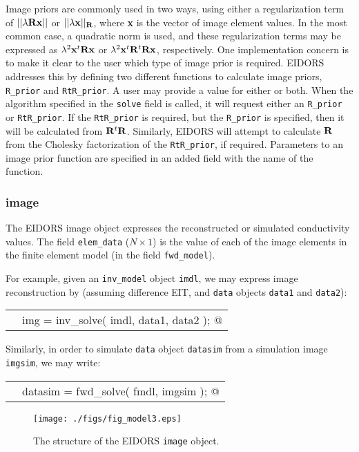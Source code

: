 \documentclass[12pt]{iopart}
\makeatletter
\newcommand{\CODEstart}{\medskip\begin{tabular}{ll}}
\newcommand{\CN}{\tt\scriptsize} %
\newcommand{\CC}{&\small\verb@}   % start code
\newcommand{\CODEend}{\end{tabular}\medskip}
\makeatother
\begin{document}
Image priors are commonly used in two ways, using either a 
regularization term of $||\lambda{\bf R}{\bf x}||$ or
$||\lambda{\bf x}||_{\bf R}$, where {\bf x} is the vector
of image element values. In the most common case, a 
quadratic norm is used, and these regularization terms
may be expressed as  $\lambda^2{\bf x}^t{\bf R}{\bf x}$
or $\lambda^2{\bf x}^t{\bf R}^t{\bf R}{\bf x}$, respectively.
One implementation concern is to make it clear to the
user which type of image prior is required. EIDORS
addresses this by defining two different functions to
calculate image priors, {\tt R\_prior} and {\tt RtR\_prior}.
A user may provide a value for either or both. When the algorithm
specified in the {\tt solve} field is called, it will request
either an {\tt R\_prior} or {\tt RtR\_prior}. If the 
{\tt RtR\_prior} is required, but the {\tt R\_prior} 
is specified, then it will be calculated from ${\bf R}^t{\bf R}$.
Similarly, EIDORS will attempt to calculate ${\bf R}$ 
from the Cholesky factorization of the {\tt RtR\_prior},
if required. Parameters to an image prior function are
specified in an added field with the name of the function.

\subsubsection{image}

The EIDORS image object expresses the reconstructed or
simulated conductivity values. The field {\tt elem\_data}
($N\times1$) is the value of each of the image elements in 
the finite element model (in the field {\tt fwd\_model}).

For example, given
an {\tt inv\_model} object {\tt imdl}, we may express
image reconstruction by (assuming
difference EIT, and {\tt data} objects {\tt data1} and {\tt data2}):

\CODEstart
\CN    \CC img = inv_solve( imdl, data1, data2 ); @\\[-3pt]
\CODEend

Similarly, in order to simulate {\tt data} object {\tt datasim}
from a simulation image {\tt imgsim}, we may write:

\CODEstart
\CN    \CC datasim = fwd_solve( fmdl, imgsim ); @\\[-3pt]
\CODEend

%
%
\begin{figure}[th]
\begin{flushright}
\texttt{[image: ./figs/fig\_model3.eps]}
\caption{\small The structure of the EIDORS {\tt image} object.
\label{fig:image}
 }
\end{flushright}
\end{figure}
\end{document}
